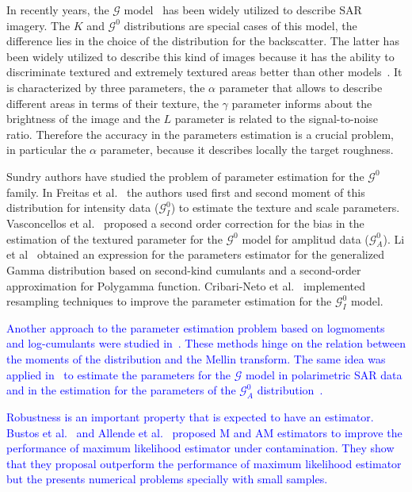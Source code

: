 \documentclass[technote,onecolumn,draftcls,12pt]{IEEEtran}
\numberwithin{equation}{section}
\begin{document}
In recently years, the $\mathcal G$ model~\cite{Frery97} has been widely utilized to describe SAR imagery. 
The $K$ and $\mathcal G^0$ distributions are special cases of this model, the difference lies in the choice of the distribution for the backscatter.  
The latter has been widely utilized to describe this kind of images because it has the ability to discriminate textured and extremely textured areas better than other models~\cite{MejailJacoboFreryBustos:IJRS}. 
It is characterized by three parameters, the $\alpha$ parameter that allows to describe different areas in terms of their texture, the $\gamma$ parameter informs about the brightness of the image and the $L$ parameter is related to the signal-to-noise ratio. 
Therefore the accuracy in the parameters estimation is a crucial problem, in particular the $\alpha$ parameter, because it describes locally the target roughness.

Sundry authors have studied the problem of parameter estimation for the $\mathcal G^0$ family. 
In Freitas et al.~\cite{Freitas2005} the authors used first and second moment of this distribution for intensity data ($\mathcal G_I^0$) to estimate the texture and scale parameters. 
Vasconcellos et al.~\cite{VasconcellosFrerySilva:CompStat} proposed a second order correction for the bias in the estimation of the textured parameter for the $\mathcal G^0$ model for amplitud data ($\mathcal G_A^0$).  
Li et al~\cite{Li2011} obtained an  expression for the parameters estimator for the generalized Gamma distribution based on second-kind cumulants and a second-order approximation for  Polygamma  function. Cribari-Neto et al.~\cite{CribariFrerySilva:CSDA} implemented resampling techniques to improve the parameter estimation for the $\mathcal G_I^0$ model. 

\textcolor{blue}{Another approach to the parameter estimation problem based on logmoments and log-cumulants were studied in~\cite{nicolas2002}. These methods hinge on the relation between the moments of the distribution and the Mellin transform. The same idea was applied in~\cite{khan2014} to estimate the parameters for the $\mathcal{G}$ model in polarimetric SAR data and in the estimation for the parameters of the $\mathcal G_A^0$ distribution~\cite{Tison2004}. }

\textcolor{blue}{Robustness is an important property  that is expected to have an estimator. Bustos et al.~\cite{BustosFreryLucini:Mestimators:2001} and Allende et al.~\cite{AllendeFreryetal:JSCS:05} proposed M and AM estimators to improve the performance of maximum likelihood estimator under
contamination. They show that they proposal outperform the performance of maximum likelihood estimator but the presents  numerical problems specially with small samples. }
\end{document}
